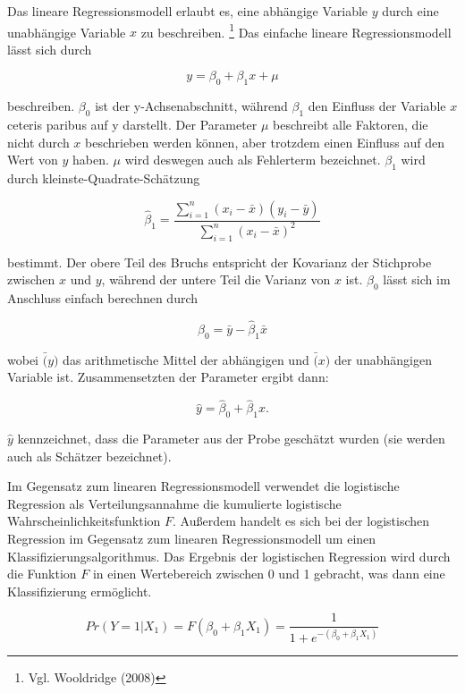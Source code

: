 \documentclass[a4paper,12pt]{article}
\begin{document}
Das lineare Regressionsmodell erlaubt es, eine abhängige Variable $y$ durch eine unabhängige Variable $x$ zu beschreiben. \footnote{Vgl. Wooldridge (2008)}
Das einfache lineare Regressionsmodell lässt sich durch

\begin{equation}
y=\beta_0+\beta_1 x+\mu
\end{equation}

beschreiben. $\beta_0$ ist der y-Achsenabschnitt, während $\beta_1$ den Einfluss der Variable $x$ ceteris paribus auf y darstellt. Der Parameter $\mu$ beschreibt alle Faktoren, die nicht durch $x$ beschrieben werden können, aber trotzdem einen Einfluss auf den Wert von $y$ haben. $\mu$ wird deswegen auch als Fehlerterm bezeichnet. 
$\beta_1$ wird durch kleinste-Quadrate-Schätzung 

\begin{equation}
\hat{\beta}_1=\frac{\sum_{i=1}^n(x_i-\bar{x})(y_i-\bar{y} )}{\sum_{i=1}^n (x_i-\bar{x})^2 }
\end{equation}

bestimmt. Der obere Teil des Bruchs entspricht der Kovarianz der Stichprobe zwischen $x$ und $y$, während der untere Teil die Varianz von $x$ ist. 
$\beta_0$ lässt sich im Anschluss einfach berechnen durch 

\begin{equation}
\beta_0=\bar{y}-\hat{\beta}_1 \bar{x}
\end{equation}

wobei $\bar(y)$ das arithmetische Mittel der abhängigen und $\bar(x)$ der unabhängigen Variable ist.
Zusammensetzten der Parameter ergibt dann: 

\begin{equation}
\hat{y}=\hat{\beta}_0+\hat{\beta}_1 x.
\end{equation}

$\hat{y} $ kennzeichnet, dass die Parameter aus der Probe geschätzt wurden (sie werden auch als Schätzer bezeichnet). 

Im Gegensatz zum linearen Regressionsmodell verwendet die logistische Regression als Verteilungsannahme die kumulierte logistische Wahrscheinlichkeitsfunktion $F$. Außerdem handelt es sich bei der logistischen Regression im Gegensatz zum linearen Regressionsmodell um einen Klassifizierungsalgorithmus. Das Ergebnis der logistischen Regression wird durch die Funktion $F$ in einen Wertebereich zwischen 0 und 1 gebracht, was dann eine Klassifizierung ermöglicht. 

\begin{equation}
Pr(Y=1|X_1)=F(\beta_0+\beta_1X_1)
= \frac{1}{1+e^{-(\beta_0+\beta_1X_1)}}
\end{equation}
\end{document}
